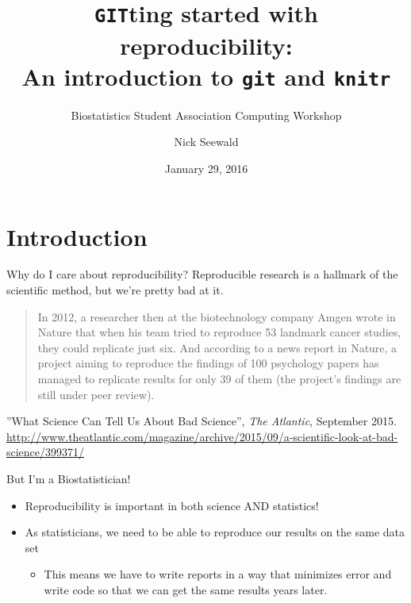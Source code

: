 \documentclass{beamer}\usepackage[]{graphicx}\usepackage[]{color}
\title[Reproducibility with \texttt{git} and \texttt{knitr}]{\texttt{GIT}ting started with reproducibility: \\ An introduction to \texttt{git} and \texttt{knitr}}
\author{Nick Seewald}
\subtitle{Biostatistics Student Association Computing Workshop}
\institute[University of Michigan]{Department of Statistics \\ University of Michigan}
\date{January 29, 2016}
\begin{document}
	
	\maketitle
	
	\section{Introduction}

	\begin{frame}{Why do I care about reproducibility?}
		Reproducible research is a hallmark of the scientific method, but we're pretty bad at it. 
		
		\begin{quote}
			In 2012, a researcher then at the biotechnology company Amgen wrote in Nature that when his team tried to reproduce 53 landmark cancer studies, they could replicate just six. And according to a news report in Nature, a project aiming to reproduce the findings of 100 psychology papers has managed to replicate results for only 39 of them (the project's findings are still under peer review).
		\end{quote}
		
		\footnotesize{''What Science Can Tell Us About Bad Science'', \textit{The Atlantic}, September 2015.} \scriptsize{\url{http://www.theatlantic.com/magazine/archive/2015/09/a-scientific-look-at-bad-science/399371/}}
	\end{frame}

	\begin{frame}{But I'm a Biostatistician!}
		\begin{itemize}
			\item Reproducibility is important in both science AND statistics!
			\item As statisticians, we need to be able to reproduce our results on the same data set
			\begin{itemize}
				\item This means we have to write reports in a way that minimizes error and write code so that we can get the same results years later.
			\end{itemize}
		\end{itemize}
	\end{frame}
	
\end{document}
